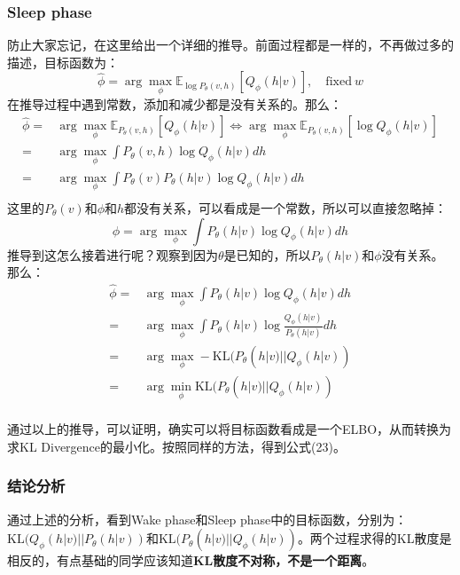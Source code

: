 \documentclass[a4paper]{article}
\begin{document}
\subsubsection{Sleep phase}
防止大家忘记，在这里给出一个详细的推导。前面过程都是一样的，不再做过多的描述，目标函数为：
\begin{equation}
    \hat{\phi} = \arg\max_\phi \mathbb{E}_{\log P_\theta(v,h)}[Q_\phi(h|v)],\quad \mathrm{fixed}\ w 
\end{equation}
在推导过程中遇到常数，添加和减少都是没有关系的。那么：
\begin{equation}
    \begin{split}
        \hat{\phi} = & \arg\max_\phi \mathbb{E}_{ P_\theta(v,h)}[Q_\phi(h|v)] \Longleftrightarrow \arg\max_\phi \mathbb{E}_{ P_\theta(v,h)}[\log Q_\phi(h|v)]\\
        = & \arg\max_\phi \int P_\theta(v,h) \log Q_\phi(h|v) dh \\
        = & \arg\max_\phi \int P_\theta(v) P_\theta(h|v) \log Q_\phi(h|v) dh \\
    \end{split}
\end{equation}
这里的$P_\theta(v)$和$\phi$和$h$都没有关系，可以看成是一个常数，所以可以直接忽略掉：
\begin{equation}
    \hat{\phi} = \arg\max_\phi \int P_\theta(h|v) \log Q_\phi(h|v) dh
\end{equation}
推导到这怎么接着进行呢？观察到因为$\theta$是已知的，所以$P_\theta(h|v)$和$\phi$没有关系。那么：
\begin{equation}
    \begin{split}
        \hat{\phi} = & \arg\max_\phi \int P_\theta(h|v) \log Q_\phi(h|v) dh \\
        = & \arg\max_\phi \int P_\theta(h|v) \log \frac{Q_\phi(h|v)}{P_\theta(h|v)} dh \\
        = & \arg\max_\phi - \mathrm{KL}(P_\theta(h|v) || Q_\phi(h|v)) \\
        = & \arg\min_\phi \mathrm{KL}(P_\theta(h|v) || Q_\phi(h|v)) \\
    \end{split}
\end{equation}

通过以上的推导，可以证明，确实可以将目标函数看成是一个ELBO，从而转换为求KL Divergence的最小化。按照同样的方法，得到公式(23)。

\subsubsection{结论分析}
通过上述的分析，看到Wake phase和Sleep phase中的目标函数，分别为：
$\mathrm{KL}(Q_\phi(h|v) || P_\theta(h|v))$和$\mathrm{KL}(P_\theta(h|v) || Q_\phi(h|v))$。两个过程求得的KL散度是相反的，有点基础的同学应该知道\textbf{KL散度不对称，不是一个距离}。
\end{document}
